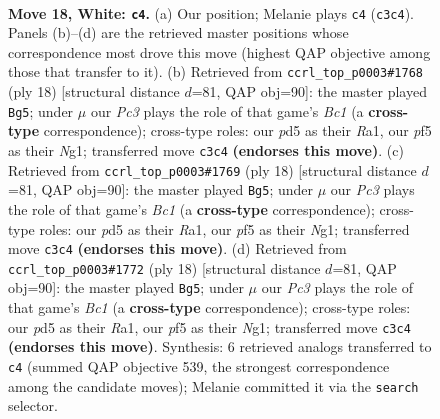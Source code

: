 \documentclass[11pt]{article}
\begin{document}
\clearpage

\begin{figure}[p]\centering
\begin{subfigure}{0.46\textwidth}\centering
\resizebox{\linewidth}{!}{%
\newchessgame
\chessboard[
  setfen={rnbq1kr1/1p2n3/4p3/1QPpPp2/p4N2/P1P1B1p1/2P3PP/R3KB1R w KQ - 0 18},
  showmover=false,
  pgfstyle=straightmove, color=movearrow, markmove={c3-c4}
]}
\caption{}
\end{subfigure}\hfill
\begin{subfigure}{0.46\textwidth}\centering
\resizebox{\linewidth}{!}{%
\newchessgame
\chessboard[
  setfen={rnbq2k1/pp2n1pp/4pr2/2pp4/3P2Q1/P1PB4/2P2PPP/R1B1K1NR w KQ - 0 10},
  showmover=false,
  pgfstyle=straightmove, color=movearrow, markmove={c1-g5}
]}
\caption{}
\end{subfigure}
\\[4pt]
\begin{subfigure}{0.46\textwidth}\centering
\resizebox{\linewidth}{!}{%
\newchessgame
\chessboard[
  setfen={rnbq2k1/pp2n1pp/4pr2/2pp4/3P2Q1/P1PB4/2P2PPP/R1B1K1NR w KQ - 0 10},
  showmover=false,
  pgfstyle=straightmove, color=movearrow, markmove={c1-g5}
]}
\caption{}
\end{subfigure}\hfill
\begin{subfigure}{0.46\textwidth}\centering
\resizebox{\linewidth}{!}{%
\newchessgame
\chessboard[
  setfen={rnbq2k1/pp2n1pp/4pr2/2pp4/3P2Q1/P1PB4/2P2PPP/R1B1K1NR w KQ - 0 10},
  showmover=false,
  pgfstyle=straightmove, color=movearrow, markmove={c1-g5}
]}
\caption{}
\end{subfigure}
\caption{\textbf{Move 18, White: \texttt{c4}.} (a) Our position; Melanie plays \texttt{c4} (\texttt{c3c4}). Panels (b)--(d) are the retrieved master positions whose correspondence most drove this move (highest QAP objective among those that transfer to it). (b) Retrieved from \texttt{ccrl\_top\_p0003\#1768} (ply 18) [structural distance $d$=81, QAP obj=90]: the master played \texttt{Bg5}; under $\mu$ our \emph{Pc3} plays the role of that game's \emph{Bc1} (a \textbf{cross-type} correspondence); cross-type roles: our \emph{p}d5 as their \emph{R}a1, our \emph{p}f5 as their \emph{N}g1; transferred move \texttt{c3c4} \textbf{(endorses this move)}. (c) Retrieved from \texttt{ccrl\_top\_p0003\#1769} (ply 18) [structural distance $d$=81, QAP obj=90]: the master played \texttt{Bg5}; under $\mu$ our \emph{Pc3} plays the role of that game's \emph{Bc1} (a \textbf{cross-type} correspondence); cross-type roles: our \emph{p}d5 as their \emph{R}a1, our \emph{p}f5 as their \emph{N}g1; transferred move \texttt{c3c4} \textbf{(endorses this move)}. (d) Retrieved from \texttt{ccrl\_top\_p0003\#1772} (ply 18) [structural distance $d$=81, QAP obj=90]: the master played \texttt{Bg5}; under $\mu$ our \emph{Pc3} plays the role of that game's \emph{Bc1} (a \textbf{cross-type} correspondence); cross-type roles: our \emph{p}d5 as their \emph{R}a1, our \emph{p}f5 as their \emph{N}g1; transferred move \texttt{c3c4} \textbf{(endorses this move)}. Synthesis: 6 retrieved analogs transferred to \texttt{c4} (summed QAP objective 539, the strongest correspondence among the candidate moves); Melanie committed it via the \texttt{search} selector.}
\label{fig:thought-m34}
\end{figure}
\end{document}
